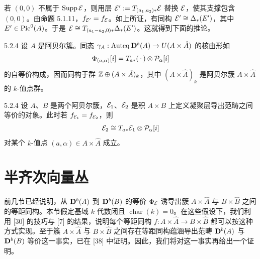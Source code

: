 若 $(0,0)$ 不属于 $\operatorname{Supp}\mathcal{E}$，则用层 $\mathcal{E}':=T_{(a_1,a_2)*}\mathcal{E}$ 替换 $\mathcal{E}$，使其支撑包含 $(0,0)$。由命题 5.1.11，$f_{\mathcal{E}'}=f_{\mathcal{E}}$。如上所证，有同构 $\mathcal{E}'\cong\Delta_*(E')$，其中 $E'\in\operatorname{Pic}^0(A)$。于是 $\mathcal{E}\cong T_{(a_1-a_2,0)*}\Delta_*(E')$。这就得到下面的推论。

\begin{proposition}{5.2.4}
设 $A$ 是阿贝尔簇。同态 $\gamma_A:\operatorname{Auteq}\mathbf{D}^{b}(A)\to U(A\times\hat A)$ 的核由形如
\begin{equation*}
\Phi_{(a,\alpha)}[i]=T_{a*}(\,\cdot\,)\otimes\mathcal{P}_\alpha[i]
\end{equation*}
的自等价构成，因而同构于群 $\mathbb{Z}\oplus(A\times\hat A)_k$，其中 $(A\times\hat A)_k$ 是阿贝尔簇 $A\times\hat A$ 的 $k$-值点群。
\end{proposition}


\begin{corollary}{5.2.4}
设 $A$、$B$ 是两个阿贝尔簇，$\mathcal{E}_1$、$\mathcal{E}_2$ 是积 $A\times B$ 上定义凝聚层导出范畴之间等价的对象。此时若 $f_{\mathcal{E}_1}=f_{\mathcal{E}_2}$，则
\begin{equation*}
\mathcal{E}_2\cong T_{a*}\mathcal{E}_1\otimes\mathcal{P}_\alpha[i]
\end{equation*}
对某个 $k$-值点 $(a,\alpha)\in A\times\hat A$ 成立。
\end{corollary}

\section{半齐次向量丛}


前几节已经说明，从 $\mathbf{D}^{b}(A)$ 到 $\mathbf{D}^{b}(B)$ 的等价 $\Phi_{\mathcal{E}}$ 诱导出簇 $A\times\hat A$ 与 $B\times\hat B$ 之间的等距同构。本节假定基域 $k$ 代数闭且 $\operatorname{char}(k)=0$。在这些假设下，我们利用 [30] 的技巧与 [7] 的结果，说明每个等距同构 $f:A\times\hat A\to B\times\hat B$ 都可以按这种方式实现。至于簇 $A\times\hat A$ 与 $B\times\hat B$ 之间存在等距同构蕴涵导出范畴 $\mathbf{D}^{b}(A)$ 与 $\mathbf{D}^{b}(B)$ 等价这一事实，已在 [38] 中证明。因此，我们将对这一事实再给出一个证明。


